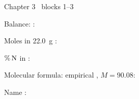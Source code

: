 \documentclass{apchem-worksheet}
\begin{document}
\begin{spiralstrip}{Chapter 3 \textbullet\ blocks 1--3}
  \item Balance: :
  \item Moles in \SI{22.0}{\gram} : 
  \item $\%\,\ce{N}$ in : 
  \item Molecular formula: empirical , $M = 90.08$:
  \item Name : 
\end{spiralstrip}
\end{document}

